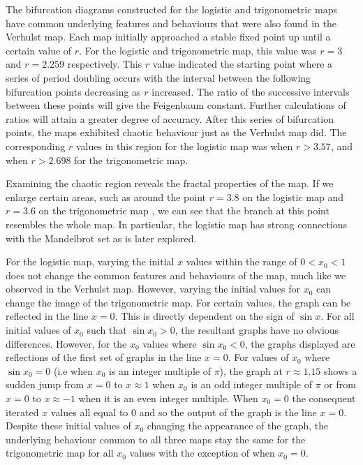\documentclass[a4paper]{article}
\begin{document}
The bifurcation diagrams constructed for the logistic and trigonometric maps have common underlying features and behaviours that were also found in the Verhulst map. Each map initially approached a stable fixed point up until a certain value of $r$. For the logistic and trigonometric map, this value was $r = 3$ and $r =2.259$ respectively. This $r$ value indicated the starting point where a series of period doubling occurs with the interval between the following bifurcation points decreasing as $r$ increased. The ratio of the successive intervals between these points will give the Feigenbaum constant. Further calculations of ratios will attain a greater degree of accuracy. After this series of bifurcation points, the maps exhibited chaotic behaviour just as the Verhulst map did. The corresponding $r$ values in this region for the logistic map was when $r > 3.57$, and when $r > 2.698$ for the trigonometric map.

Examining the chaotic region reveals the fractal properties of the map. If we enlarge certain areas, such as around the point $ r = 3.8 $ on the logistic map and $ r = 3.6 $ on the trigonometric map , we can see that the branch at this point resembles the whole map. In particular, the logistic map has strong connections with the Mandelbrot set as is later explored.

For the logistic map, varying the initial $x$ values within the range of $ 0 < x_0 < 1$ does not change the common features and behaviours of the map, much like we observed in the Verhulst map. However, varying the initial values for $x_0$ can change the image of the trigonometric map. For certain values, the graph can be reflected in the line $x = 0$. This is directly dependent on the sign of $\sin{x}$. For all initial values of $x_0$ such that $\sin{x_0} > 0$, the resultant graphs have no obvious differences. However, for the $x_0$ values where $\sin{x_0} < 0$, the graphs displayed are reflections of the first set of graphs in the line $x = 0$. For values of $x_0$ where $\sin{x_0} = 0$ (i.e when $x_0$ is an integer multiple of $\pi$), the graph at $r \approx 1.15$ shows a sudden jump from $x = 0$ to $x \approx 1$  when $x_0$ is an odd integer multiple of $\pi$ or from $x = 0$ to $x \approx -1$ when it is an even integer multiple. When $x_0 = 0$ the consequent iterated $x$ values all equal to $0$ and so the output of the graph is the line $x = 0$. Despite these initial values of $x_0$ changing the appearance of the graph, the underlying behaviour common to all three maps stay the same for the trigonometric map for all $x_0$ values with the exception of when $x_0 = 0$. 
\end{document}
